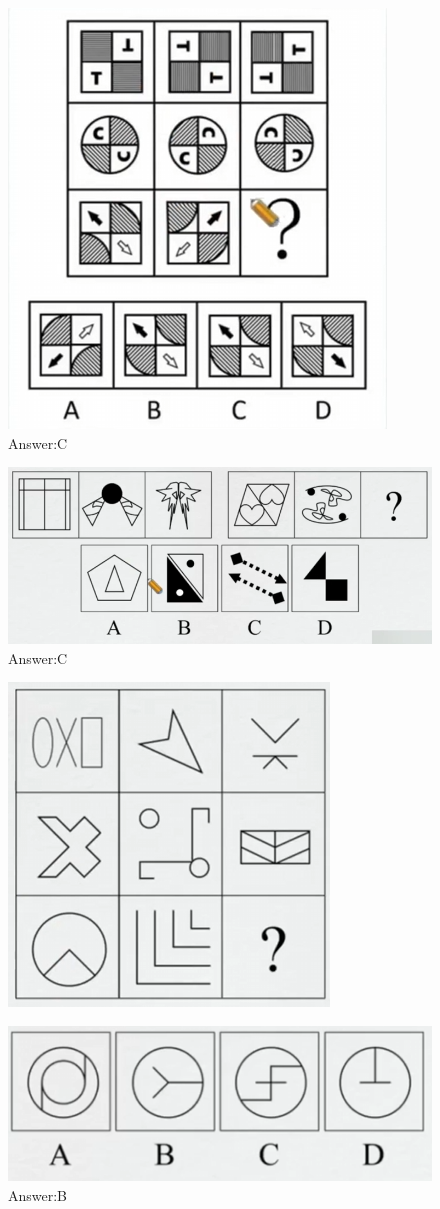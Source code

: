 \documentclass{article}
\numberwithin{equation}{section}						%
\numberwithin{figure}{section}							%
\begin{document}
\begin{sloppypar}
\begin{figure}[H]
     \centering
     \includegraphics[width=0.5\linewidth]{8.png}
		\caption{Answer:C}
 \end{figure}


\begin{figure}[H]
     \centering
     \includegraphics[width=0.5\linewidth]{9.png}
		\caption{Answer:C}
 \end{figure}

\begin{figure}[H]
     \centering
     \includegraphics[width=0.5\linewidth]{10.png}
 \end{figure}

\begin{figure}[H]
     \centering
     \includegraphics[width=0.5\linewidth]{11.png}
		\caption{Answer:B}
 \end{figure}


\end{sloppypar}
\end{document}
